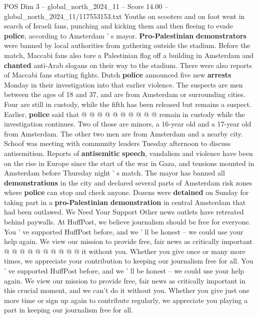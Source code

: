 \begin{textsample}{POS Dim 3 – global\_north\_2024\_11 – Score 14.00 – global\_north\_2024\_11/117553153.txt}
Youths on scooters and on foot went in search of Israeli fans, punching and kicking them and then fleeing to evade \textbf{police}, according to Amsterdam ' s mayor. \textbf{Pro-Palestinian} \textbf{demonstrators} were banned by local authorities from gathering outside the stadium.
Before the match, Maccabi fans also tore a Palestinian flag off a building in Amsterdam and \textbf{chanted} anti-Arab slogans on their way to the stadium.
There were also reports of Maccabi fans starting fights.
Dutch \textbf{police} announced five new \textbf{arrests} Monday in their investigation into that earlier violence.
The suspects are men between the ages of 18 and 37, and are from Amsterdam or surrounding cities.
Four are still in custody, while the fifth has been released but remains a suspect.
Earlier, \textbf{police} said that @ @ @ @ @ @ @ @ @ @ remain in custody while the investigation continues.
Two of those are minors, a 16-year old and a 17-year old from Amsterdam.
The other two men are from Amsterdam and a nearby city.
Schoof was meeting with community leaders Tuesday afternoon to discuss antisemitism.
Reports of \textbf{antisemitic} \textbf{speech}, vandalism and violence have been on the rise in Europe since the start of the war in Gaza, and tensions mounted in Amsterdam before Thursday night ' s match.
The mayor has banned all \textbf{demonstrations} in the city and declared several parts of Amsterdam risk zones where \textbf{police} can stop and check anyone.
Dozens were \textbf{detained} on Sunday for taking part in a \textbf{pro-Palestinian} \textbf{demonstration} in central Amsterdam that had been outlawed.
We Need Your Support Other news outlets have retreated behind paywalls.
At HuffPost, we believe journalism should be free for everyone.
You ' ve supported HuffPost before, and we ' ll be honest -- we could use your help again.
We view our mission to provide free, fair news as critically important @ @ @ @ @ @ @ @ @ @ it without you.
Whether you give once or many more times, we appreciate your contribution to keeping our journalism free for all.
You ' ve supported HuffPost before, and we ' ll be honest -- we could use your help again.
We view our mission to provide free, fair news as critically important in this crucial moment, and we can't do it without you.
Whether you give just one more time or sign up again to contribute regularly, we appreciate you playing a part in keeping our journalism free for all.

\end{textsample}
